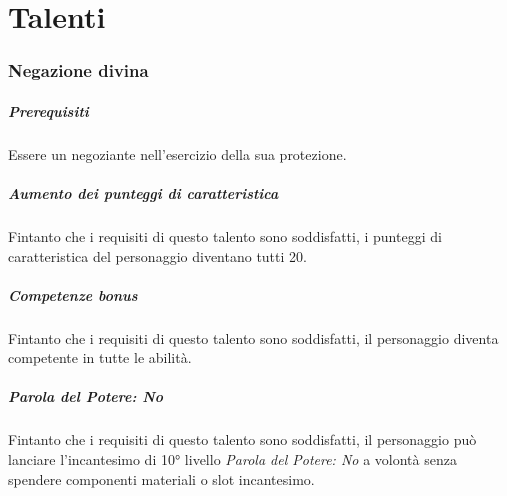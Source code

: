 \chapter{Talenti}

\subsection{Negazione divina}

\paragraph{Prerequisiti}Essere un negoziante nell'esercizio della sua protezione.
\paragraph{Aumento dei punteggi di caratteristica} Fintanto che i requisiti di questo talento sono soddisfatti, i punteggi di caratteristica del personaggio diventano tutti 20.
\paragraph{Competenze bonus}Fintanto che i requisiti di questo talento sono soddisfatti, il personaggio diventa competente in tutte le abilità.
\paragraph{Parola del Potere: No}Fintanto che i requisiti di questo talento sono soddisfatti, il personaggio può lanciare l'incantesimo di 10° livello \textit{Parola del Potere: No} a volontà senza spendere componenti materiali o slot incantesimo.

